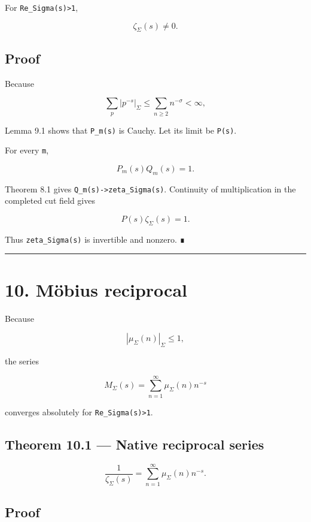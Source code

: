 For \texttt{Re\_Sigma(s)\textgreater{}1},

\[
\boxed{
\zeta_\Sigma(s)\ne0.
}
\]

\hypertarget{proof-13}{%
\subsection{Proof}\label{proof-13}}

Because

\[
\sum_p|p^{-s}|_\Sigma
\le
\sum_{n\ge2}n^{-\sigma}<\infty,
\]

Lemma 9.1 shows that \texttt{P\_m(s)} is Cauchy. Let its limit be \texttt{P(s)}.

For every \texttt{m},

\[
P_m(s)Q_m(s)=1.
\]

Theorem 8.1 gives \texttt{Q\_m(s)-\textgreater{}zeta\_Sigma(s)}. Continuity of multiplication in the
completed cut field gives

\[
P(s)\zeta_\Sigma(s)=1.
\]

Thus \texttt{zeta\_Sigma(s)} is invertible and nonzero. ∎

\begin{center}\rule{0.5\linewidth}{0.5pt}\end{center}

\hypertarget{muxf6bius-reciprocal}{%
\section{10. Möbius reciprocal}\label{muxf6bius-reciprocal}}

Because

\[
|\mu_\Sigma(n)|_\Sigma\le1,
\]

the series

\[
M_\Sigma(s)
=
\sum_{n=1}^{\infty}
\mu_\Sigma(n)n^{-s}
\]

converges absolutely for \texttt{Re\_Sigma(s)\textgreater{}1}.

\hypertarget{theorem-10.1-native-reciprocal-series}{%
\subsection{Theorem 10.1 --- Native reciprocal series}\label{theorem-10.1-native-reciprocal-series}}

\[
\boxed{
\frac{1}{\zeta_\Sigma(s)}
=
\sum_{n=1}^{\infty}
\mu_\Sigma(n)n^{-s}.
}
\]

\hypertarget{proof-14}{%
\subsection{Proof}\label{proof-14}}

